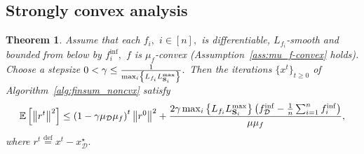 \documentclass{article}
\newcommand{\bb}{\mathbb}
\newcommand{\cD}{\mathcal{D}}
\newcommand{\eqdef}{\stackrel{\text{def}}{=}}
\newcommand{\Exp}[1]{{\bb E}\left[#1\right]}
\newtheorem{theorem}{Theorem}
\theoremstyle{plain}
\newcommand{\tf}{f_{\mathcal{D}}}
\newcommand{\mS}{{\bf S}}
\theoremstyle{plain}
\theoremstyle{definition}
\theoremstyle{remark}
\begin{document}
\subsection{Strongly convex analysis}
\begin{theorem}
	Assume that each $f_i,$ $i\in[n],$ is differentiable, $L_{f_i}$-smooth and bounded from below by $f_i^{\inf},$ $f$ is $\mu_f$-convex (Assumption~\ref{ass:mu_f-convex} holds). Choose a stepsize $0<\gamma \leq \frac{1}{\max_i\left\lbrace L_{f_i}L_{\mS_i}^{\max} \right\rbrace}.$ Then the iterations $\{x^t\}_{t\geq 0}$ of Algorithm~\ref{alg:finsum_noncvx} satisfy
		\begin{equation*}
		\Exp{\left\|r^{t}\right\|^2} \leq \left(1-\gamma\mu_{\mathcal{D}}\mu_f\right)^t\left\|r^0\right\|^2 + \frac{2\gamma\max_i\left\lbrace L_{f_i}L_{\mS_i}^{\max} \right\rbrace \left(\tf^{\inf} - \frac{1}{n}\sum_{i=1}^{n}f_i^{\inf}\right)}{\mu\mu_f},
	\end{equation*}
	where $r^t\eqdef x^t - x_\cD^\star.$
\end{theorem}
\end{document}
